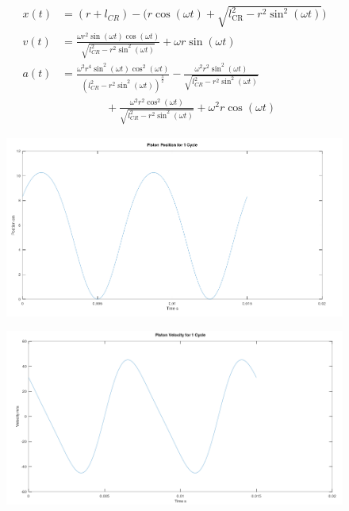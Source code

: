 \documentclass[10pt,a4paper]{article}
\begin{document}
\begin{align*}
	x(t ) &= (r + l_{CR}) - \Big(r \cos (\omega t)  + \sqrt{l_{\text{CR}}^2 - r^2 \sin^2 (\omega t )} \Big)\\
	v(t ) &=  \frac{\omega r^{2} \sin{\left (\omega t \right )} \cos{\left (\omega t \right )}}{\sqrt{l_{CR}^{2} - r^{2} \sin^{2}{\left (\omega t \right )}}} + \omega r \sin{\left (\omega t \right )}\\
	a (t) &=  \frac{\omega^{2} r^{4} \sin^{2}{\left (\omega t \right )} \cos^{2}{\left (\omega t \right )}}{\left(l_{CR}^{2} - r^{2} \sin^{2}{\left (\omega t \right )}\right)^{\frac{3}{2}}} - \frac{\omega^{2} r^{2} \sin^{2}{\left (\omega t \right )}}{\sqrt{l_{CR}^{2} - r^{2} \sin^{2}{\left (\omega t \right )}}}\nonumber \\
	&  \qquad \qquad + \frac{\omega^{2} r^{2} \cos^{2}{\left (\omega t \right )}}{\sqrt{l_{CR}^{2} - r^{2} \sin^{2}{\left (\omega t \right )}}} + \omega^{2} r \cos{\left (\omega t \right )}
\end{align*}
\begin{figure}[H]
		\centering
		\includegraphics[width=\textwidth]{Selection_364.png}
	\end{figure}
	\begin{figure}[H]
		\centering
		\includegraphics[width=\textwidth]{Selection_363.png}
	\end{figure}
\end{document}
